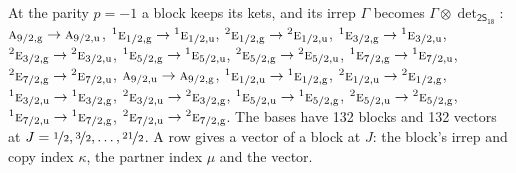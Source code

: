 \documentclass[10pt,a4paper]{article}
\numberwithin{equation}{section}
\newcommand{\grp}[1]{\mathsf{#1}}
\newcommand{\irr}[1]{\text{\normalfont\scshape #1}}
\newcommand{\conjpair}[1]{{}^{#1}}
\newcommand{\ptag}[1]{\mathrm{#1}}
\newcommand{\irrprod}{\otimes}
\newcommand{\mult}{\kappa}
\newcommand{\intx}{\mu}
\begin{document}
At the parity $p = -1$ a block keeps its kets, and its irrep $\Gamma$ becomes $\Gamma \irrprod \det_{\grp{2S_{18}}}$: $\irr{a}_{9/2,\ptag{g}} \to \irr{a}_{9/2,\ptag{u}}$, $\conjpair{1}\irr{e}_{1/2,\ptag{g}} \to \conjpair{1}\irr{e}_{1/2,\ptag{u}}$, $\conjpair{2}\irr{e}_{1/2,\ptag{g}} \to \conjpair{2}\irr{e}_{1/2,\ptag{u}}$, $\conjpair{1}\irr{e}_{3/2,\ptag{g}} \to \conjpair{1}\irr{e}_{3/2,\ptag{u}}$, $\conjpair{2}\irr{e}_{3/2,\ptag{g}} \to \conjpair{2}\irr{e}_{3/2,\ptag{u}}$, $\conjpair{1}\irr{e}_{5/2,\ptag{g}} \to \conjpair{1}\irr{e}_{5/2,\ptag{u}}$, $\conjpair{2}\irr{e}_{5/2,\ptag{g}} \to \conjpair{2}\irr{e}_{5/2,\ptag{u}}$, $\conjpair{1}\irr{e}_{7/2,\ptag{g}} \to \conjpair{1}\irr{e}_{7/2,\ptag{u}}$, $\conjpair{2}\irr{e}_{7/2,\ptag{g}} \to \conjpair{2}\irr{e}_{7/2,\ptag{u}}$, $\irr{a}_{9/2,\ptag{u}} \to \irr{a}_{9/2,\ptag{g}}$, $\conjpair{1}\irr{e}_{1/2,\ptag{u}} \to \conjpair{1}\irr{e}_{1/2,\ptag{g}}$, $\conjpair{2}\irr{e}_{1/2,\ptag{u}} \to \conjpair{2}\irr{e}_{1/2,\ptag{g}}$, $\conjpair{1}\irr{e}_{3/2,\ptag{u}} \to \conjpair{1}\irr{e}_{3/2,\ptag{g}}$, $\conjpair{2}\irr{e}_{3/2,\ptag{u}} \to \conjpair{2}\irr{e}_{3/2,\ptag{g}}$, $\conjpair{1}\irr{e}_{5/2,\ptag{u}} \to \conjpair{1}\irr{e}_{5/2,\ptag{g}}$, $\conjpair{2}\irr{e}_{5/2,\ptag{u}} \to \conjpair{2}\irr{e}_{5/2,\ptag{g}}$, $\conjpair{1}\irr{e}_{7/2,\ptag{u}} \to \conjpair{1}\irr{e}_{7/2,\ptag{g}}$, $\conjpair{2}\irr{e}_{7/2,\ptag{u}} \to \conjpair{2}\irr{e}_{7/2,\ptag{g}}$.
The bases have 132 blocks and 132 vectors at $J = \nicefrac{1}{2}, \nicefrac{3}{2}, \dots, \nicefrac{21}{2}$. \label{n:index.copy}\label{n:head.vector}A row gives a vector of a block at $J$: the block's irrep and copy index $\mult$, the partner index $\intx$ and the vector.
\end{document}
